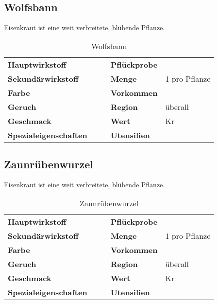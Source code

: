 \subsection{Wolfsbann}
Eisenkraut ist eine weit verbreitete, blühende Pflanze. 

\begin{table}[h]
\begin{center}
\begin{tabular}{|l|l|p{1cm}|l|l|}
	\cline{1-2} \cline{4-5}
	\textbf{Hauptwirkstoff} &  && \textbf{Pflückprobe} &  \\ \cline{1-2} \cline{4-5}
	\textbf{Sekundärwirkstoff} &  && \textbf{Menge} & 1 pro Pflanze \\ \cline{1-2} \cline{4-5}
	\textbf{Farbe} &  && \textbf{Vorkommen} &  \\ \cline{1-2} \cline{4-5}
	\textbf{Geruch} &  && \textbf{Region} & überall \\ \cline{1-2} \cline{4-5}
	\textbf{Geschmack} &  && \textbf{Wert} & Kr \\ \cline{1-2} \cline{4-5}
	\textbf{Spezialeigenschaften} &  && \textbf{Utensilien} &  \\ \cline{1-2} \cline{4-5}
\end{tabular}
\end{center}
\caption{Wolfsbann}
\label{tab:wolfsbann}
\end{table}


\subsection{Zaunrübenwurzel}
Eisenkraut ist eine weit verbreitete, blühende Pflanze. 

\begin{table}[h]
\begin{center}
\begin{tabular}{|l|l|p{1cm}|l|l|}
	\cline{1-2} \cline{4-5}
	\textbf{Hauptwirkstoff} &  && \textbf{Pflückprobe} &  \\ \cline{1-2} \cline{4-5}
	\textbf{Sekundärwirkstoff} &  && \textbf{Menge} & 1 pro Pflanze \\ \cline{1-2} \cline{4-5}
	\textbf{Farbe} &  && \textbf{Vorkommen} &  \\ \cline{1-2} \cline{4-5}
	\textbf{Geruch} &  && \textbf{Region} & überall \\ \cline{1-2} \cline{4-5}
	\textbf{Geschmack} &  && \textbf{Wert} & Kr \\ \cline{1-2} \cline{4-5}
	\textbf{Spezialeigenschaften} &  && \textbf{Utensilien} &  \\ \cline{1-2} \cline{4-5}
\end{tabular}
\end{center}
\caption{Zaunrübenwurzel}
\label{tab:zaunruebenwurzel}
\end{table}
